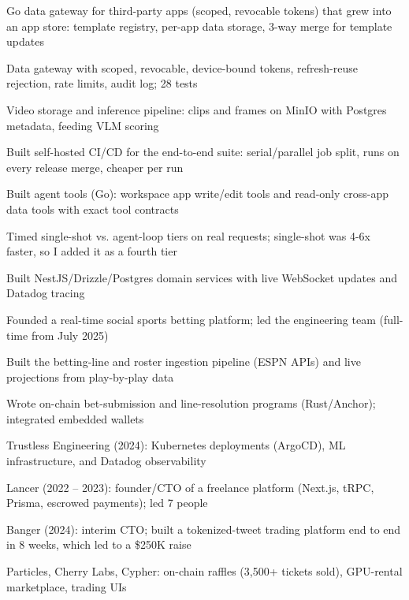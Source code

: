 \documentclass[print]{jack-resume}
\begin{document}
\begin{tightemize}
    \item Go data gateway for third-party apps (scoped, revocable tokens) that grew into an app store: template registry, per-app data storage, 3-way merge for template updates
    \item Data gateway with scoped, revocable, device-bound tokens, refresh-reuse rejection, rate limits, audit log; 28 tests
    \item Video storage and inference pipeline: clips and frames on MinIO with Postgres metadata, feeding VLM scoring
    \item Built self-hosted CI/CD for the end-to-end suite: serial/parallel job split, runs on every release merge, cheaper per run
    \item Built agent tools (Go): workspace app write/edit tools and read-only cross-app data tools with exact tool contracts
    \item Timed single-shot vs. agent-loop tiers on real requests; single-shot was 4-6x faster, so I added it as a fourth tier
\end{tightemize}
\sectionsep

\begin{tightemize}
    \item Built NestJS/Drizzle/Postgres domain services with live WebSocket updates and Datadog tracing
    \item Founded a real-time social sports betting platform; led the engineering team (full-time from July 2025)
    \item Built the betting-line and roster ingestion pipeline (ESPN APIs) and live projections from play-by-play data
    \item Wrote on-chain bet-submission and line-resolution programs (Rust/Anchor); integrated embedded wallets
\end{tightemize}
\sectionsep

\begin{tightemize}
    \item Trustless Engineering (2024): Kubernetes deployments (ArgoCD), ML infrastructure, and Datadog observability
    \item Lancer (2022 – 2023): founder/CTO of a freelance platform (Next.js, tRPC, Prisma, escrowed payments); led 7 people
    \item Banger (2024): interim CTO; built a tokenized-tweet trading platform end to end in 8 weeks, which led to a \$250K raise
    \item Particles, Cherry Labs, Cypher: on-chain raffles (3,500+ tickets sold), GPU-rental marketplace, trading UIs
\end{tightemize}
\sectionsep
\end{document}
